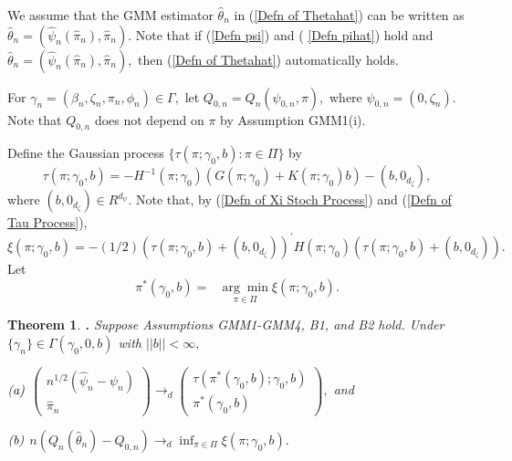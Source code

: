 \documentclass[12pt,thmsb,titlepage,final,oneside,letterpaper]{article}
\newtheorem{theorem}{Theorem}[section]
\begin{document}
We assume that the GMM estimator $\widehat{\theta }_{n}$ in (\ref{Defn of
Thetahat}) can be written as $\widehat{\theta }_{n}=(\widehat{\psi }_{n}(%
\widehat{\pi }_{n}),\widehat{\pi }_{n}).$ Note that if (\ref{Defn psi}) and (%
\ref{Defn pihat}) hold and $\widehat{\theta }_{n}=(\widehat{\psi }_{n}(%
\widehat{\pi }_{n}),\widehat{\pi }_{n}),$ then (\ref{Defn of Thetahat})
automatically holds.

For $\gamma _{n}=(\beta _{n},\zeta _{n},\pi _{n},\phi _{n})\in \Gamma ,$ let 
$Q_{0,n}=Q_{n}(\psi _{0,n},\pi ),$ where $\psi _{0,n}=(0,\zeta _{n}).$ Note
that $Q_{0,n}$ does not depend on $\pi $ by Assumption GMM1(i).

Define the Gaussian process $\{\tau (\pi ;\gamma _{0},b):\pi \in \Pi \}$ by%
\begin{equation}
\tau (\pi ;\gamma _{0},b)=-H^{-1}(\pi ;\gamma _{0})(G(\pi ;\gamma
_{0})+K(\pi ;\gamma _{0})b)-(b,0_{d_{\zeta }}),  \label{Defn of Tau Process}
\end{equation}%
where $(b,0_{d_{\zeta }})\in R^{d_{\psi }}.$ Note that, by (\ref{Defn of Xi
Stoch Process}) and (\ref{Defn of Tau Process}), $\xi (\pi ;\gamma
_{0},b)=-(1/2)(\tau (\pi ;\gamma _{0},b)+(b,0_{d_{\zeta }}))^{\prime }H(\pi
;\gamma _{0})(\tau (\pi ;\gamma _{0},b)+(b,0_{d_{\zeta }})).$ Let%
\begin{equation}
\pi ^{\ast }(\gamma _{0},b)=\text{ }\underset{\pi \in \Pi }{\arg \min }\text{
}\xi (\pi ;\gamma _{0},b).  \label{PiStar Process}
\end{equation}

\begin{theorem}
\hspace{-0.08in}\textbf{. }\label{Thm dist'n of estimator b=finite}Suppose
Assumptions \emph{GMM1-GMM4,} \emph{B1, }and \emph{B2} hold. Under $\{\gamma
_{n}\}\in \Gamma (\gamma _{0},0,b)$ with $||b||<\infty ,$

\noindent $\emph{(a)}$ $\left( 
\begin{array}{c}
n^{1/2}(\widehat{\psi }_{n}-\psi _{n}) \\ 
\widehat{\pi }_{n}%
\end{array}%
\right) \overset{}{\rightarrow _{d}}\left( 
\begin{array}{c}
\tau (\pi ^{\ast }(\gamma _{0},b);\gamma _{0},b) \\ 
\pi ^{\ast }(\gamma _{0},b)%
\end{array}%
\right) ,$ and

\noindent $\emph{(b)}$ $n\left( Q_{n}(\widehat{\theta }_{n})-Q_{0,n}\right) 
\overset{}{\rightarrow _{d}}\inf_{\pi \in \Pi }\xi (\pi ;\gamma _{0},b).$
\end{theorem}
\end{document}
